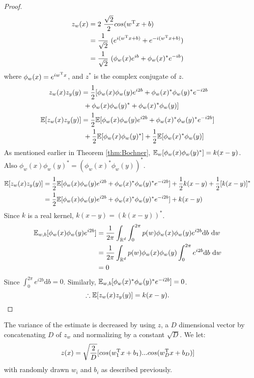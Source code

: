 \documentclass[twoside]{memoir}
\begin{document}
\begin{proof}
	\begin{equation*}
	\begin{split}
	z_w(x) &= 2 ~ \frac{\sqrt{2}}{2}cos(w^{\text{T}}x + b) \\
	&= \frac{1}{\sqrt{2}}~(e^{i(w^{\text{T}}x+b)} + e^{-i(w^{\text{T}}x+b)}) \\
	&= \frac{1}{\sqrt{2}}~(\phi_w(x)e^{ib} + \phi_w(x)^* e^{-ib})
	\end{split}
	\end{equation*}
	where $\phi_w(x) = e^{iw^{\text{T}}x}$, and $z^*$ is the complex conjugate of $z$.
	\begin{equation*}
	\begin{split}
	z_w(x)z_y(y) &= \frac{1}{2}[\phi_w(x)\phi_w(y)e^{i2b} + \phi_w(x)^*\phi_w(y)^*e^{-i2b} \\
	&~ + \phi_w(x)\phi_w(y)^* + \phi_w(x)^*\phi_w(y)] \\
	\mathbb{E}[z_w(x)z_y(y)] &= \frac{1}{2}\mathbb{E}[\phi_w(x)\phi_w(y)e^{i2b} + \phi_w(x)^*\phi_w(y)^*e^{-i2b}]\\
	&~ + \frac{1}{2}\mathbb{E}[\phi_w(x)\phi_w(y)^*] + \frac{1}{2}\mathbb{E}[\phi_w(x)^*\phi_w(y)] \\ 
	\end{split}
	\end{equation*}
	As mentioned earlier in Theorem \ref{thm:Bochner}, $\mathbb{E}_w[\phi_w(x)\phi_w(y)^*] = k(x - y)$.
	Also $\phi_w(x)\phi_w(y)^* = (\phi_w(x)^*\phi_w(y))^*$.
	\begin{equation*}
	\begin{split}
	\mathbb{E}[z_w(x)z_y(y)] &= \frac{1}{2}\mathbb{E}[\phi_w(x)\phi_w(y)e^{i2b} + \phi_w(x)^*\phi_w(y)^*e^{-i2b}]
	+ \frac{1}{2}k(x-y) + \frac{1}{2}[k(x-y)]^* \\
	&= \frac{1}{2}\mathbb{E}[\phi_w(x)\phi_w(y)e^{i2b} + \phi_w(x)^*\phi_w(y)^*e^{-i2b}] + k(x-y)
	\end{split}
	\end{equation*}
	Since $k$ is a real kernel, $k(x - y) = (k(x - y))^*$.
	\begin{equation*}
	\begin{split}
	\mathbb{E}_{w,b}[\phi_w(x)\phi_w(y)e^{i2b}] &= \frac{1}{2\pi}\int_{\mathbb{R}^d}\int_{0}^{2\pi} p(w)\phi_w(x)\phi_w(y)e^{i2b} \text{d}b~\text{d}w \\
	&= \frac{1}{2\pi}\int_{\mathbb{R}^d} p(w)\phi_w(x)\phi_w(y) \int_{0}^{2\pi} e^{i2b} \text{d}b~\text{d}w \\
	&= 0
	\end{split}
	\end{equation*}
	Since $\int_{0}^{2\pi} e^{i2b} \text{d}b = 0$. Similarly, $	\mathbb{E}_{w,b}[\phi_w(x)^*\phi_w(y)^*e^{-i2b}] = 0$.
	\[ \therefore \mathbb{E}[z_w(x)z_y(y)] = k(x - y). \]
	
\end{proof}
The variance of the estimate is decreased by using $z$, a $D$ dimensional vector by concatenating $D$ of $z_w$ and normalizing by a constant $\sqrt{D}$. We let:
\[z(x) = \sqrt{\frac{2}{D}} [cos(w_1^{\text{T}}x + b_1) ... cos(w_D^{\text{T}}x + b_D)] \]
with randomly drawn $w_i$ and $b_i$ as described previously. \\
\end{document}
